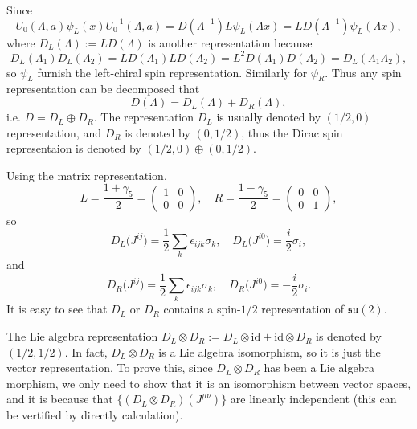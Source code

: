 \documentclass[9pt]{extbook}
\begin{document}
Since
\[
	U_0(\Lambda,a)\psi_L(x)U_0^{-1}(\Lambda,a)=D(\Lambda^{-1})L\psi_L(\Lambda x)=LD(\Lambda^{-1})\psi_L(\Lambda x),
\]
where $D_L(\Lambda):=LD(\Lambda)$ is another representation because
\[
	D_L(\Lambda_1)D_L(\Lambda_2)=LD(\Lambda_1)LD(\Lambda_2)=L^2D(\Lambda_1)D(\Lambda_2)=D_L(\Lambda_1\Lambda_2),
\]
so $\psi_L$ furnish the left-chiral spin representation. Similarly for $\psi_R$. Thus any spin representation can be decomposed that
\[
	D(\Lambda)=D_L(\Lambda)+D_R(\Lambda),
\]
i.e. $D=D_L\oplus D_R$. The representation $D_L$ is usually denoted by $(1/2,0)$ representation, and $D_R$ is denoted by $(0,1/2)$, thus the Dirac spin representaion is denoted by $(1/2,0)\oplus (0,1/2)$.

Using the matrix representation,
\[
	L=\frac{1+\gamma_5}{2}=\begin{pmatrix}
		1&0\\
		0&0
	\end{pmatrix},\quad R=\frac{1-\gamma_5}{2}=\begin{pmatrix}
		0&0\\
		0&1
	\end{pmatrix},
\]
so
\[
	D_L\bigl(J^{ij}\bigr)=\frac{1}{2}\sum_k\epsilon_{ijk}\sigma_k,\quad D_L\bigl(J^{i0}\bigr)=\frac{i}{2}\sigma_i,
\]
and
\[
	D_R\bigl(J^{ij}\bigr)=\frac{1}{2}\sum_k\epsilon_{ijk}\sigma_k,\quad D_R\bigl(J^{i0}\bigr)=-\frac{i}{2}\sigma_i.
\]
It is easy to see that $D_L$ or $D_R$ contains a spin-$1/2$ representation of $\mathfrak{su}(2)$.

The Lie algebra representation $D_L\otimes D_R:=D_L\otimes \mathrm{id}+\mathrm{id} \otimes D_R$ is denoted by $(1/2,1/2)$. In fact, $D_L\otimes D_R$ is a Lie algebra isomorphism, so it is just the vector representation. To prove this, since $D_L\otimes D_R$ has been a Lie algebra morphism, we only need to show that it is an isomorphism between vector spaces, and it is because that $\{(D_L\otimes D_R)(J^{\mu\nu})\}$ are linearly independent (this can be vertified by directly calculation). 
\end{document}
